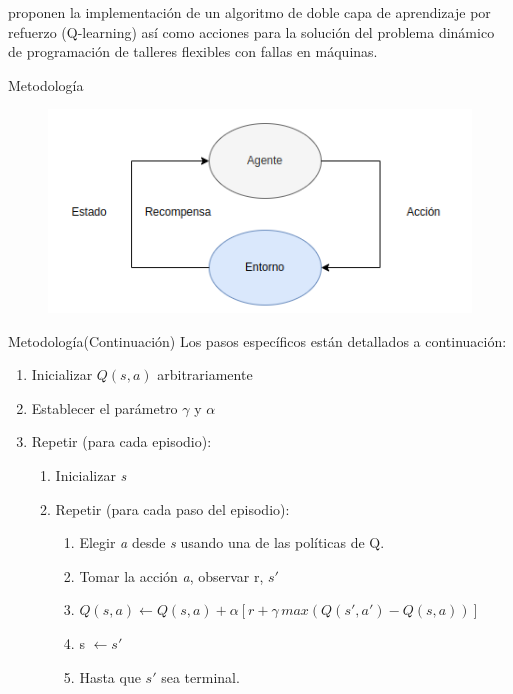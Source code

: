 \documentclass{beamer}
\begin{document}
\begin{frame}{}
	\cite{zhao2019improved} proponen la implementación de un algoritmo de doble capa de aprendizaje por refuerzo (Q-learning) así como acciones para la solución del problema dinámico de programación de talleres flexibles con fallas en máquinas.
\end{frame}

\begin{frame}{Metodología}

    \begin{figure}[h!t]
    \centering
    \includegraphics[scale = 0.7 ]{diagrama}
    \end{figure}

\end{frame}

\begin{frame}{Metodología}{(Continuación)}
	Los pasos específicos están detallados a continuación:
	
	\begin{enumerate}
		\item Inicializar $Q(s,a)$ arbitrariamente
		\item Establecer el parámetro $\gamma$ y $\alpha$
		\item Repetir (para cada episodio):
		\begin{enumerate}[1]
			\item Inicializar \textit{s}
			\item Repetir (para cada paso del episodio):
			\begin{enumerate}[2.1]
				\item Elegir \textit{a} desde \textit{s} usando una de las políticas de Q.
				\item Tomar la acción \textit{a}, observar r, $s'$
				\item $	\displaystyle	Q(s,a) \leftarrow Q(s,a) + \alpha[r + \gamma \, max(Q(s',a') - Q(s,a) )] $
				\item s $\leftarrow s'$ 
				\item Hasta que $s'$ sea terminal.
			\end{enumerate}
		\end{enumerate}
	\end{enumerate}
\end{frame}
\end{document}
